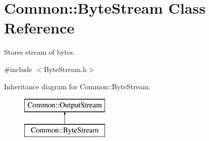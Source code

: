 \hypertarget{class_common_1_1_byte_stream}{\section{Common\-:\-:Byte\-Stream Class Reference}
\label{class_common_1_1_byte_stream}
}


Stores stream of bytes.  




{\ttfamily \#include $<$Byte\-Stream.\-h$>$}

Inheritance diagram for Common\-:\-:Byte\-Stream\-:\begin{figure}[H]
\begin{center}
\leavevmode
\includegraphics[height=2.000000cm]{class_common_1_1_byte_stream}
\end{center}
\end{figure}
